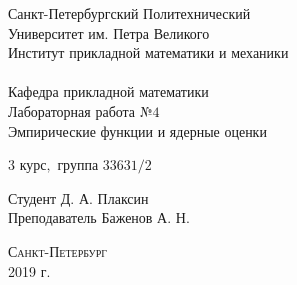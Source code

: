 \documentclass[a4]{article}
\begin{document}
\def\contentsname{\LARGE{Содержание}}
\thispagestyle{empty}
\begin{center} 
\vspace{2cm} 
{\Large \sc Санкт-Петербургский Политехнический}\\
\vspace{2mm}
{\Large \sc Университет} им. {\Large\sc Петра Великого}\\
\vspace{1cm}
{\large \sc Институт прикладной математики и механики\\ 
\vspace{0.5mm}
\textsc{}}\\ 
\vspace{0.5mm}
{\large\sc Кафедра прикладной математики}\\
\vspace{15mm}
{\huge \sc Лабораторная работа №$4$\\
\vspace{4mm}
Эмпирические функции и ядерные оценки
\vspace{6mm}
 }
\vspace*{2mm}
\vspace{1cm}

{\sc $3$ курс$,$ группа $33631/2$}

\vspace{2cm} 
Студент \hfill Д. А. Плаксин\\
\vspace{1cm}
Преподаватель \hfill Баженов А. Н.\\
\vspace{20mm} 

\end{center} 
\begin{center}
\vfill {\large\textsc{Санкт-Петербург}}\\ 
2019 г.
\end{center}

\end{document}
